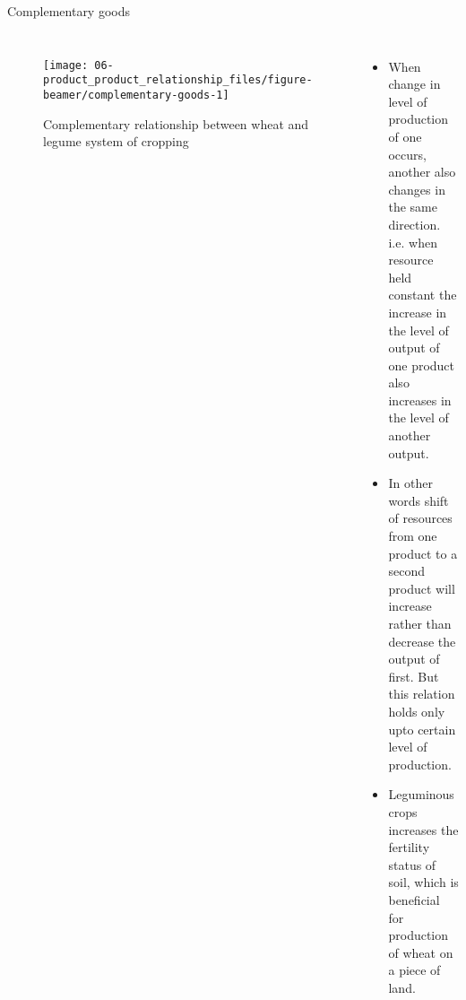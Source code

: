 \documentclass[12pt,ignorenonframetext,aspectratio=169]{beamer}
\begin{document}
\begin{frame}{Complementary goods}
\protect\hypertarget{complementary-goods}{}
\begin{columns}

\begin{figure}

{\centering \texttt{[image: 06-product\_product\_relationship\_files/figure-beamer/complementary-goods-1]} 

}

\caption{Complementary relationship between wheat and legume system of cropping}\label{fig:complementary-goods}
\end{figure}

  \footnotesize
  \begin{itemize}
  \item When change in level of production of one occurs, another also changes in the same direction. i.e. when resource held constant the increase in the level of output of one product also increases in the level of another output. 
  \item In other words shift of resources from one product to a second product will increase rather than decrease the output of first. But this relation holds only upto certain level of production. 
  \item Leguminous crops increases the fertility status of soil, which is beneficial for production of wheat on a piece of land.
  \end{itemize}

\end{columns}
\end{frame}
\end{document}
